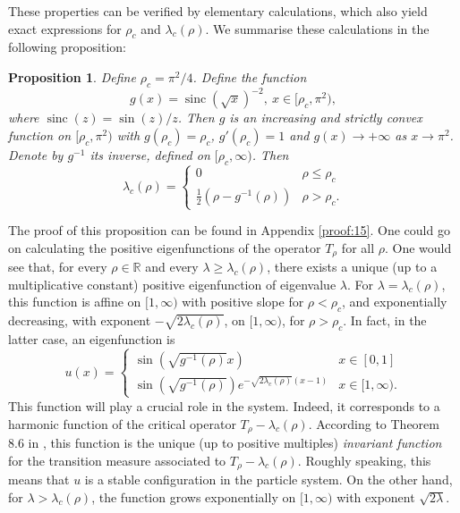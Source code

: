 \documentclass[11pt]{article}
\theoremstyle{plain}
\newtheorem{proposition}[lemma]{Proposition}
\newcommand{\sinc}{\operatorname{sinc}}
\begin{document}
These properties can be verified by elementary calculations, which also yield exact expressions for $\rho_c$ and $\lambda_c(\rho)$. We summarise these calculations in the following proposition:

\begin{proposition}\label{th:Trho}
Define $\rho_c = \pi^2/4$. Define the function
\[
g(x) = \sinc(\sqrt{x})^{-2},\ x\in [\rho_c,\pi^2),
\]
where $\sinc(z) = \sin(z)/z$.
Then $g$ is an increasing and strictly convex function on $[\rho_c,\pi^2)$ with $g(\rho_c) = \rho_c$, $g'(\rho_c) = 1$ and $g(x) \to +\infty$ as $x\to \pi^2$. Denote by $g^{-1}$ its inverse, defined on $[\rho_c,\infty)$. Then
\[
\lambda_c(\rho) = \begin{cases}
 0 & \rho \le \rho_c\\
 \frac 1 2 (\rho - g^{-1}(\rho)) & \rho > \rho_c.
\end{cases}
\]
\end{proposition}


The proof of this proposition can be found in Appendix \ref{proof:15}. One could go on calculating the positive eigenfunctions of the operator $T_\rho$ for all $\rho$. One would see that, for every $\rho\in \mathbb{R}$ and every $\lambda \ge \lambda_c(\rho)$, there exists a unique (up to a multiplicative constant) positive eigenfunction of eigenvalue $\lambda$. For $\lambda = \lambda_c(\rho)$, this function is affine on $[1,\infty)$ with positive slope for $\rho < \rho_c$, and exponentially decreasing, with exponent $-\sqrt{2\lambda_c(\rho)}$, on $[1,\infty)$, for $\rho > \rho_c$. In fact, in the latter case, an eigenfunction is
\[
u(x) = \begin{cases}
 \sin(\sqrt{g^{-1}(\rho)} x) & x\in[0,1]\\
 \sin(\sqrt{g^{-1}(\rho)}) e^{-\sqrt{2\lambda_c(\rho)}(x-1)} & x\in[1,\infty).
\end{cases}
\] This function will play a crucial role in the system. Indeed, it corresponds to a harmonic function of the critical operator $T_\rho-\lambda_c(\rho)$. According to Theorem 8.6 in \cite{Pinsky1995}, this function is the unique (up to positive multiples) \textit{invariant function} for the transition measure associated to $T_\rho-\lambda_c(\rho)$. Roughly speaking, this means that $u$ is a stable configuration in the particle system. On the other hand, for $\lambda > \lambda_c(\rho)$, the function grows exponentially on $[1,\infty)$ with exponent $\sqrt{2\lambda}$.
\end{document}
